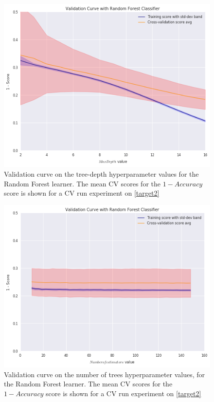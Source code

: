 \begin{figure}[h!]
	\begin{center}
	 \includegraphics[width=1\linewidth]{figures/random-forest/validation_curve_forest_depth_series_f1}
		\caption{ Validation curve on the tree-depth hyperparameter values for the Random Forest  learner.
			The mean CV scores for the $1 - Accuracy$ score is shown for a CV run experiment on \cref{target2}}
		\label{fig:random_forest_validation_curves_depth_trees}

	\end{center}
\end{figure}

\begin{figure}[h!]
	\begin{center}
		\includegraphics[width=1\linewidth]{figures/random-forest/validation_curve_forest_num_trees_series_f1}
			\caption{ Validation curve on the number of trees hyperparameter values, for the Random Forest  learner.
				The mean CV scores for the $1 - Accuracy$ score is shown for a CV run experiment on \cref{target2}}
		\label{fig:random_forest_validation_curves_num_trees}
	\end{center}
\end{figure}

